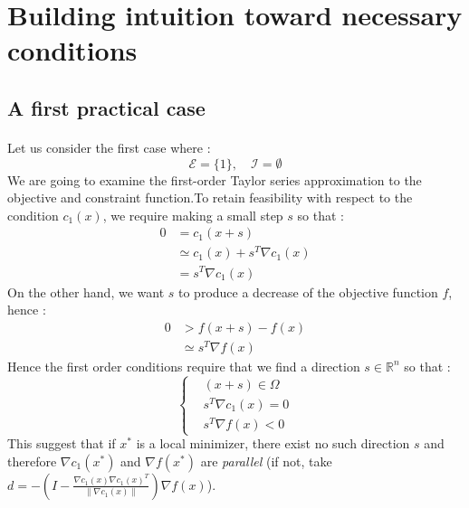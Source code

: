 \documentclass[a4paper]{article}
\begin{document}
	\section{Building intuition toward necessary conditions}
	{
		\subsection{A first practical case}
		{
			\paragraph{} Let us consider the first case where : 
			\begin{equation}
				\mathcal{E} = \{1\}, \quad \mathcal{I} = \emptyset
			\end{equation}
			We are going to examine the first-order Taylor series approximation to the objective and constraint function.To retain feasibility with respect to the condition $c_1(x)$, we require making a small step $s$ so that : 
			\begin{equation}
				\begin{aligned}
					0 &= c_1(x+s) \\
					   &\simeq c_1(x) + s^T\nabla c_1(x) \\
					   &= s^T\nabla c_1(x) 
				\end{aligned}
			\end{equation}
			On the other hand, we want $s$ to produce a decrease of the objective function $f$, hence : 
			\begin{equation}
				\begin{aligned}
					0 &> f(x+s) - f(x) \\
					   &\simeq s^T\nabla f(x) 
				\end{aligned}
			\end{equation}
			Hence the first order conditions require that we find a direction $s\in\mathbb{R}^n$ so that : 
			\begin{equation}
				\left\{\begin{aligned}
					&(x+s) \in\Omega \\
					& s^T\nabla c_1(x) = 0\\
					& s^T\nabla f(x) < 0 
				\end{aligned}\right.
			\end{equation}
			This suggest that if $x^*$ is a local minimizer, there exist no such direction $s$ and therefore $\nabla c_1(x^*)$ and $\nabla f(x^*)$ are \emph{parallel} (if not, take $ d = -\left(I - \displaystyle\frac{\nabla c_1(x) \nabla c_1(x)^T}{\lVert \nabla c_1(x) \rVert }\right)\nabla f(x) $). 
			
}}
\end{document}

